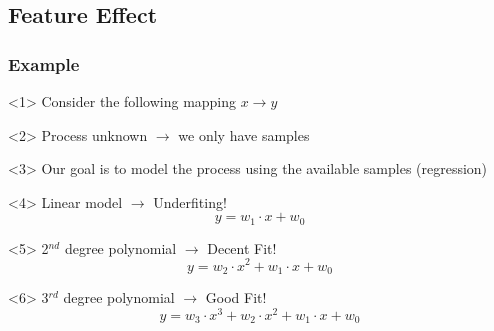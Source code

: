 \subsection{Feature Effect}

\begin{frame}
  \frametitle{Example}
  \begin{onlyenv}<1>
    Consider the following mapping $x \rightarrow y$
    \begin{center}
      \scalebox{0.5}{
        
      }
    \end{center}
  \end{onlyenv}
  \begin{onlyenv}<2>
    Process unknown \(\rightarrow\) we only have samples
    \begin{center}
      \scalebox{0.5}{
        
      }
    \end{center}
  \end{onlyenv}
  \begin{onlyenv}<3>
    Our goal is to model the process using the available samples (regression)
    \vspace{1cm}\\
  \end{onlyenv}
  \begin{onlyenv}<4>
    Linear model \(\rightarrow\) Underfiting!
    \begin{equation*}
      y = w_1\cdot x + w_0
    \end{equation*}
    \begin{center}
      \scalebox{0.5}{
        
      }
    \end{center}
  \end{onlyenv}
  \begin{onlyenv}<5>
    2$^{nd}$ degree polynomial \(\rightarrow\) Decent Fit!
    \begin{equation*}
      y = w_2\cdot x^2 + w_1\cdot x + w_0
    \end{equation*}
    \begin{center}
      \scalebox{0.5}{
        
      }
    \end{center}
  \end{onlyenv}
  \begin{onlyenv}<6>
    3$^{rd}$ degree polynomial \(\rightarrow\) Good Fit!
    \begin{equation*}
      y = w_3\cdot x^3 + w_2\cdot x^2 + w_1\cdot x + w_0

\end{equation*}
\end{onlyenv}
\end{frame}
